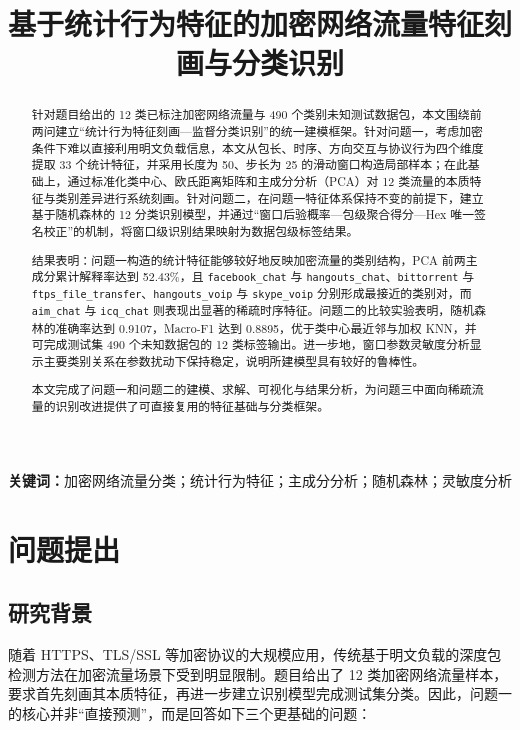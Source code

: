 \documentclass[UTF8,a4paper,12pt]{ctexart}
\title{\heiti \zihao{2} 基于统计行为特征的加密网络流量特征刻画与分类识别}
\date{}
\begin{document}
\maketitle

\begin{abstract}
针对题目给出的 12 类已标注加密网络流量与 490 个类别未知测试数据包，本文围绕前两问建立“统计行为特征刻画—监督分类识别”的统一建模框架。针对问题一，考虑加密条件下难以直接利用明文负载信息，本文从包长、时序、方向交互与协议行为四个维度提取 33 个统计特征，并采用长度为 50、步长为 25 的滑动窗口构造局部样本；在此基础上，通过标准化类中心、欧氏距离矩阵和主成分分析（PCA）对 12 类流量的本质特征与类别差异进行系统刻画。针对问题二，在问题一特征体系保持不变的前提下，建立基于随机森林的 12 分类识别模型，并通过“窗口后验概率—包级聚合得分—Hex 唯一签名校正”的机制，将窗口级识别结果映射为数据包级标签结果。

结果表明：问题一构造的统计特征能够较好地反映加密流量的类别结构，PCA 前两主成分累计解释率达到 52.43\%，且 \texttt{facebook\_chat} 与 \texttt{hangouts\_chat}、\texttt{bittorrent} 与 \texttt{ftps\_file\_transfer}、\texttt{hangouts\_voip} 与 \texttt{skype\_voip} 分别形成最接近的类别对，而 \texttt{aim\_chat} 与 \texttt{icq\_chat} 则表现出显著的稀疏时序特征。问题二的比较实验表明，随机森林的准确率达到 0.9107，Macro-F1 达到 0.8895，优于类中心最近邻与加权 KNN，并可完成测试集 490 个未知数据包的 12 类标签输出。进一步地，窗口参数灵敏度分析显示主要类别关系在参数扰动下保持稳定，说明所建模型具有较好的鲁棒性。

本文完成了问题一和问题二的建模、求解、可视化与结果分析，为问题三中面向稀疏流量的识别改进提供了可直接复用的特征基础与分类框架。
\end{abstract}

\noindent\textbf{关键词：}加密网络流量分类；统计行为特征；主成分分析；随机森林；灵敏度分析

\tableofcontents
\newpage

\section{问题提出}

\subsection{研究背景}
随着 HTTPS、TLS/SSL 等加密协议的大规模应用，传统基于明文负载的深度包检测方法在加密流量场景下受到明显限制。题目给出了 12 类加密网络流量样本，要求首先刻画其本质特征，再进一步建立识别模型完成测试集分类。因此，问题一的核心并非“直接预测”，而是回答如下三个更基础的问题：
\end{document}
